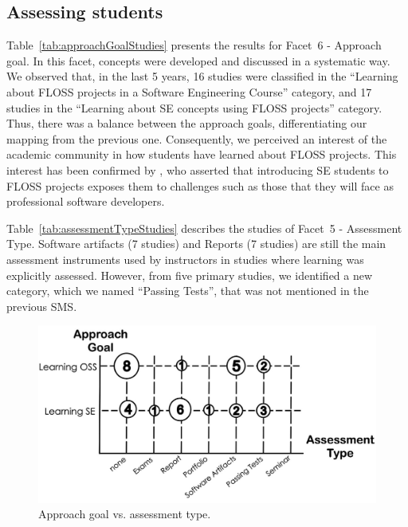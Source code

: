 \subsection{Assessing students}

Table~\ref{tab:approachGoalStudies} presents the results
for Facet~6 - Approach goal. 
In this facet, concepts were developed and discussed in a systematic way. 
We observed that, in the last 5 years, 
16 studies were classified in the 
``Learning about FLOSS projects in a Software Engineering Course'' 
category, and 17 studies in the 
``Learning about SE concepts using FLOSS projects'' category. 
Thus, there was a balance between 
the approach goals, differentiating our mapping from the previous one. 
Consequently, we perceived an interest of the academic community in 
how students have learned about FLOSS projects.
This interest has been confirmed by \citeauthor{id1088}, 
who asserted that introducing SE students to FLOSS projects 
exposes them to challenges such as 
those that they will face as professional software developers.



Table~\ref{tab:assessmentTypeStudies} describes
the studies of Facet~5 - Assessment Type. 
Software artifacts (7 studies) and Reports (7 studies) 
are still the main assessment instruments used by instructors 
in studies where learning was explicitly assessed.
However, from five primary studies,
we identified a new category, which we named ``Passing Tests'', 
that was not mentioned in the previous SMS.



\begin{figure}[t]
\includegraphics[width=\linewidth]{fig/mapa03.jpg}
\caption{Approach goal vs. assessment type.} \label{fig:mapa04}
\end{figure}

